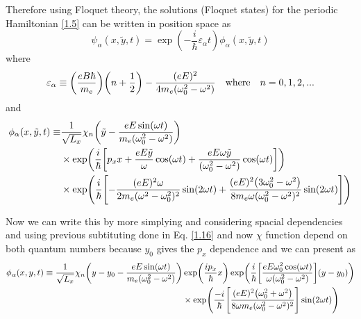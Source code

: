 \vspace{5mm}
\noindent
Therefore using Floquet theory, the solutions (Floquet states) for the periodic Hamiltonian \eqref{1.5} can be written in position space as
\begin{equation} \label{3.17}
  \psi_{\alpha}(x,\tilde{y},t) =
  \exp(-\frac{i}{\hbar}\varepsilon_{\alpha}t)   \phi_{\alpha} (x,\tilde{y},t)
\end{equation}
where
\begin{equation} \label{3.18}
  \varepsilon_{\alpha} \equiv
  \qty(\frac{eB\hbar }{m_e})\qty(n + \frac{1}{2}) -
  \frac{(eE)^2}{4m_e(\omega_0^2 - \omega^2)}
  \quad \text{where} \quad
  n = 0,1,2, ...
\end{equation}
and
\begin{equation} \label{3.19}
  \begin{aligned}
    \phi_{\alpha}(x,\tilde{y},t) \equiv &
    \frac{1}{\sqrt{L_x}}
    \chi_{n}\qty(\tilde{y} - \frac{eE\sin(\omega t)}{m_e(\omega_0^2 - \omega^2)} ) \\
    & \times
    \exp(
     \frac{i}{\hbar}\qty[
     p_x x +
     \frac{eE\tilde{y}}{\omega}\cos(\omega t)+
     \frac{eE\omega \tilde{y} }{(\omega_0^2 - \omega^2)}\cos(\omega t)
     ])\\
     & \times
     \exp(\frac{i}{\hbar}\qty[
     -\frac{(eE)^2\omega }{2m_e(\omega^2 - \omega_0^2)^2}\sin(2\omega t)
     + \frac{(eE)^2\qty(3\omega_0^2 - \omega^2)}{8m_e\omega(\omega_0^2 - \omega^2)^2} \sin(2\omega t)
  ])
  \end{aligned}
\end{equation}

\noindent
Now we can write this by more simplying and considering spacial dependencies and using previous subtituting done in Eq. \eqref{1.16} and now $\chi$ function depend on both quantum numbers because $y_0$ gives the $p_x$ dependence and we can present as
\begin{equation} \label{3.20}
  \begin{aligned}
    \phi_{\alpha}(x,y,t)  \equiv
    \frac{1}{\sqrt{L_x}}
    \chi_{n}\qty(y - y_0 - \frac{eE\sin(\omega t)}{m_e(\omega_0^2 - \omega^2)} ) &
    \exp( \frac{i p_x }{\hbar}x )
    \exp(
     \frac{i}{\hbar}
     \qty[
     \frac{eE\omega_0^2\cos(\omega t)}{\omega(\omega_0^2 - \omega^2)}]
     \qty(y - y_0 ))\\
     & \times
     \exp(\frac{-i}{\hbar}
     \qty[
     \frac{(eE)^2\qty(\omega_0^2 + \omega^2)}{8\omega m_e(\omega_0^2 - \omega^2)^2}
     ]\sin(2\omega t)
     )
  \end{aligned}
\end{equation}

